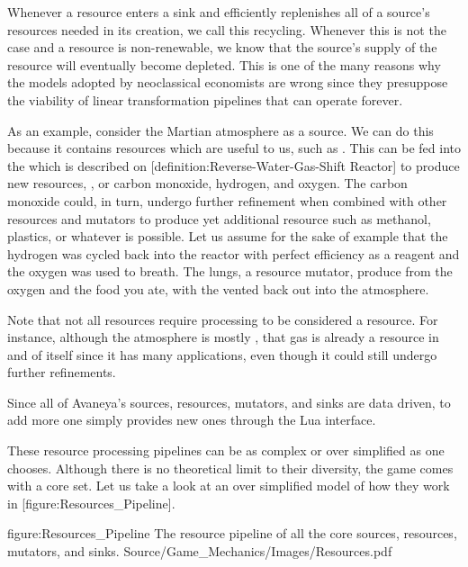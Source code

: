 Whenever a resource enters a sink and efficiently replenishes all of a source's resources needed in its creation, we call this recycling. Whenever this is not the case and a resource is non-renewable, we know that the source's supply of the resource will eventually become depleted. This is one of the many reasons why the models adopted by neoclassical economists are wrong since they presuppose the viability of linear transformation pipelines that can operate forever.

As an example, consider the Martian atmosphere as a source. We can do this because it contains resources which are useful to us, such as . This  can be fed into the  which is described on [definition:Reverse-Water-Gas-Shift Reactor] to produce new resources, , or carbon monoxide, hydrogen, and oxygen. The carbon monoxide could, in turn, undergo further refinement when combined with other resources and mutators to produce yet additional resource such as methanol, plastics, or whatever is possible. Let us assume for the sake of example that the hydrogen was cycled back into the reactor with perfect efficiency as a reagent and the oxygen was used to breath. The lungs, a resource mutator, produce  from the oxygen and the food you ate, with the  vented back out into the atmosphere.

Note that not all resources require processing to be considered a resource. For instance, although the atmosphere is mostly , that gas is already a resource in and of itself since it has many applications, even though it could still undergo further refinements.

Since all of Avaneya's sources, resources, mutators, and sinks are data driven, to add more one simply provides new ones through the Lua interface. 

These resource processing pipelines can be as complex or over simplified as one chooses. Although there is no theoretical limit to their diversity, the game comes with a core set. Let us take a look at an over simplified model of how they work in [figure:Resources_Pipeline].

\FullPageDiagram
    {figure:Resources_Pipeline}
    {The resource pipeline of all the core sources, resources, mutators, and sinks.}
    {Source/Game_Mechanics/Images/Resources.pdf}

